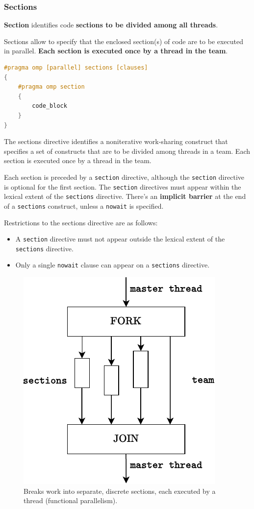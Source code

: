 \subsubsection{Sections}

\textbf{Section} identifies code \textbf{sections to be divided among all threads}.

\highspace
Sections allow to specify that the enclosed section(s) of code are to be executed in parallel. \textbf{Each section is executed once by a thread in the team}.

\begin{openmpbox}[: sections]
\begin{lstlisting}[language=C++]
#pragma omp [parallel] sections [clauses]
{
    #pragma omp section
    {
        code_block
    }
}\end{lstlisting}
\end{openmpbox}

\noindent
The sections directive identifies a noniterative work-sharing construct that specifies a set of constructs that are to be divided among threads in a team. Each section is executed once by a thread in the team.

\highspace
Each section is preceded by a \texttt{section} directive, although the \texttt{section} directive is optional for the first section. The \texttt{section} directives must appear within the lexical extent of the \texttt{sections} directive. There's an \textbf{implicit barrier} at the end of a \texttt{sections} construct, unless a \texttt{nowait} is specified.

\highspace
Restrictions to the sections directive are as follows:
\begin{itemize}
    \item A \texttt{section} directive must not appear outside the lexical extent of the \texttt{sections} directive.
    \item Only a single \texttt{nowait} clause can appear on a \texttt{sections} directive.
\end{itemize}

\begin{figure}[!htp]
    \centering
    \includegraphics[width=.45\textwidth]{img/openmp-sections-1.pdf}
    \caption{Breaks work into separate, discrete sections, each executed by a thread (functional parallelism).}
\end{figure}

